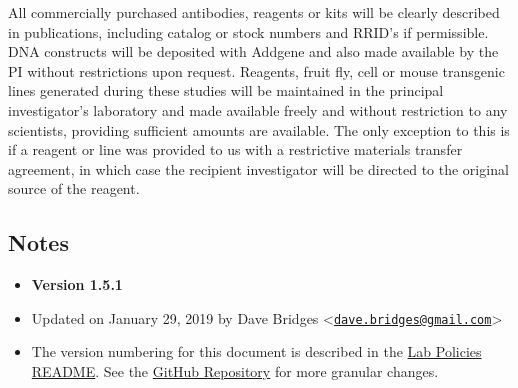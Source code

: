 All commercially purchased antibodies, reagents or kits will be clearly
described in publications, including catalog or stock numbers and RRID's
if permissible. DNA constructs will be deposited with Addgene and also
made available by the PI without restrictions upon request. Reagents,
fruit fly, cell or mouse transgenic lines generated during these studies
will be maintained in the principal investigator's laboratory and made
available freely and without restriction to any scientists, providing
sufficient amounts are available. The only exception to this is if a
reagent or line was provided to us with a restrictive materials transfer
agreement, in which case the recipient investigator will be directed to
the original source of the reagent.

\subsection{Notes}\label{notes}

\begin{itemize}
\tightlist
\item
  \textbf{Version 1.5.1}
\item
  Updated on January 29, 2019 by Dave Bridges
  \textless{}\href{mailto:dave.bridges@gmail.com}{\nolinkurl{dave.bridges@gmail.com}}\textgreater{}
\item
  The version numbering for this document is described in the
  \href{https://github.com/BridgesLab/Lab-Documents/blob/master/Lab\%20Policies/README.rst}{Lab
  Policies README}. See the
  \href{https://github.com/BridgesLab/Lab-Documents/blob/master/Lab\%20Policies/data-resource-sharing.md}{GitHub
  Repository} for more granular changes.
\end{itemize}

